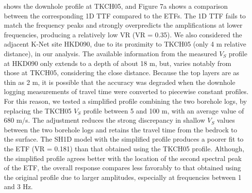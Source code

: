  shows the downhole profile at TKCH05, and Figure 7a shows a comparison between the corresponding 1D TTF compared to the ETFs. The 1D TTF fails to match the frequency peaks and strongly overpredicts the amplifications at lower frequencies, producing a relatively low VR (VR = 0.35). We also considered the adjacent K-Net site HKD090, due to its proximity to TKCH05 (only 4 m relative distance), in our analysis. The available information from the measured $V_S$ profile at HKD090 only extends to a depth of about 18 m, but, varies notably from those at TKCH05, considering the close distance. Because the top layers are as thin as 2 m, it is possible that the accuracy was degraded when the downhole logging measurements of travel time were converted to piecewise constant profiles. For this reason, we tested a simplified profile combining the two borehole logs, by replacing the TKCH05 $V_S$ profile between 5 and 100 m, with an average value of 680 m/s. The adjustment reduces the strong discrepancy in shallow $V_S$ values between the two borehole logs and retains the travel time from the bedrock to the surface. The SH1D model with the simplified profile produces a poorer fit to the ETF (VR = 0.181) than that obtained using the TKCH05 profile. Although, the simplified profile agrees better with the location of the second spectral peak of the ETF, the overall response compares less favorably to that obtained using the original profile due to larger amplitudes, especially at frequencies between 1 and 3 Hz.


